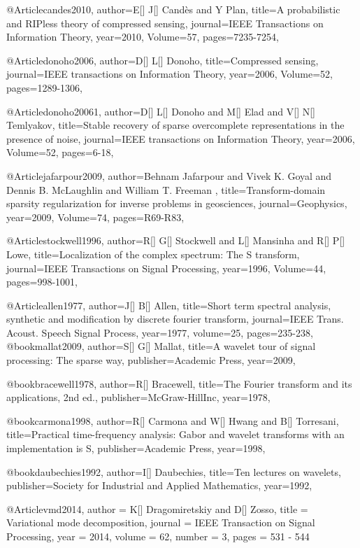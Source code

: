 {@Article{candes2010,
  author={E[] J[] Cand\`{e}s and Y Plan},
  title={A probabilistic and RIPless theory of compressed sensing},
  journal={IEEE Transactions on Information Theory},
  year=2010,
  Volume=57,
  pages={7235-7254},
}


@Article{donoho2006,
  author={D[] L[] Donoho},
  title={Compressed sensing},
  journal={IEEE transactions on Information Theory},
  year=2006,
  Volume=52,
  pages={1289-1306},
}

@Article{donoho20061,
  author={D[] L[] Donoho and M[] Elad and V[] N[] Temlyakov},
  title={Stable recovery of sparse overcomplete representations in the presence of noise},
  journal={IEEE transactions on Information Theory},
  year=2006,
  Volume=52,
  pages={6-18},
}

@Article{jafarpour2009,
  author={Behnam Jafarpour and Vivek K. Goyal and Dennis B. McLaughlin and William T. Freeman },
  title={Transform-domain sparsity regularization for inverse problems in
geosciences},
  journal={Geophysics},
  year=2009,
  Volume=74,
  pages={R69-R83},
}

@Article{stockwell1996,
  author={R[] G[] Stockwell and L[] Mansinha and R[] P[] Lowe},
  title={Localization of the complex spectrum: The S transform},
  journal={IEEE Transactions on Signal Processing},
  year=1996,
  Volume=44,
  pages={998-1001},
}

@Article{allen1977,
  author={J[] B[] Allen},
  title={Short term spectral analysis, synthetic and modification by discrete fourier transform},
  journal={IEEE Trans. Acoust. Speech Signal Process},
  year=1977,
  volume=25,
  pages={235-238},
}
@book{mallat2009,
  author={S[] G[] Mallat},
  title={A wavelet tour of signal processing: The sparse way},
  publisher={Academic Press},
  year=2009,
}

@book{bracewell1978,
  author={R[] Bracewell},
  title={The Fourier transform and its applications, 2nd ed.},
  publisher={McGraw-HillInc},
  year=1978,
}

@book{carmona1998,
  author={R[] Carmona and W[] Hwang and B[] Torresani},
  title={Practical time-frequency analysis: Gabor and wavelet transforms with an implementation is S},
  publisher={Academic Press},
  year=1998,
}

@book{daubechies1992,
  author={I[] Daubechies},
  title={Ten lectures on wavelets},
  publisher={Society for Industrial and Applied Mathematics},
  year=1992,
}

@Article{vmd2014,
  author = 	 {K[] Dragomiretskiy and D[] Zosso},
  title = 	 {Variational mode decomposition},
  journal = 	 {IEEE Transaction on Signal Processing},
  year = 	 2014,
  volume = 62,
  number = 3,
  pages = 	 {531 - 544}
}

}

